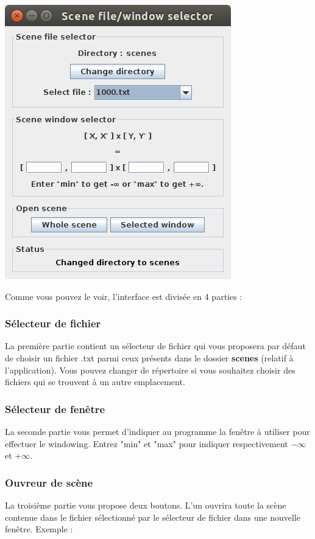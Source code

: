 \documentclass[10pt,a4paper]{article}
\begin{document}
\centerline{\includegraphics[scale=0.5]{images/ui.png}}

Comme vous pouvez le voir, l'interface est divisée en 4 parties :
\subsubsection{Sélecteur de fichier}
La première partie contient un sélecteur de fichier qui vous proposera par défaut de choisir un fichier .txt parmi ceux présents dans le dossier \textbf{scenes} (relatif à l'application). Vous pouvez changer de répertoire si vous souhaitez choisir des fichiers qui se trouvent à un autre emplacement.

\subsubsection{Sélecteur de fenêtre}
La seconde partie vous permet d'indiquer au programme la fenêtre à utiliser pour effectuer le windowing. Entrez "min" et "max" pour indiquer respectivement $-\infty$ et $+\infty$.

\subsubsection{Ouvreur de scène}
La troisième partie vous propose deux boutons. L'un ouvrira toute la scène contenue dans le fichier sélectionné par le sélecteur de fichier dans une nouvelle fenêtre. Exemple :
\end{document}
